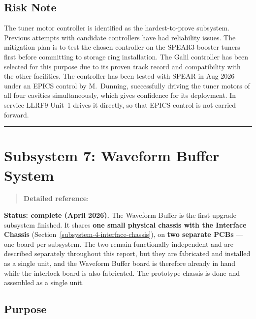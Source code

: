 \subsection{Risk Note}\label{risk-note}

The tuner motor controller is identified as the hardest-to-prove subsystem. Previous attempts with candidate controllers have had reliability issues. The mitigation plan is to test the chosen controller on the SPEAR3 booster tuners first before committing to storage ring installation. The Galil controller has been selected for this purpose due to its proven track record and compatibility with the other facilities. The controller has been tested with SPEAR in Aug 2026 under an EPICS control by M.~Dunning, successfully driving the tuner motors of all four cavities simultaneously, which gives confidence for its deployment. In service LLRF9 Unit~1 drives it directly, so that EPICS control is not carried forward.

\begin{center}\rule{0.5\linewidth}{0.5pt}\end{center}

\section{Subsystem 7: Waveform Buffer System}\label{subsystem-7-waveform-buffer-system}

\begin{quote}
\textbf{Detailed reference}: 
\end{quote}

\begin{keynote}
\textbf{Status: complete (April 2026).} The Waveform Buffer is the first upgrade
subsystem finished. It shares \textbf{one small physical chassis with the
Interface Chassis} (Section~\ref{subsystem-4-interface-chassis}), on \textbf{two
separate PCBs} --- one board per subsystem. The two remain functionally
independent and are described separately throughout this report, but they are
fabricated and installed as a single unit, and the Waveform Buffer board is
therefore already in hand while the interlock board is also fabricated. The prototype chassis is done and assembled as a single unit.
\end{keynote}

\subsection{Purpose}\label{purpose-1}


